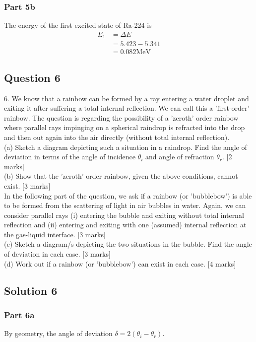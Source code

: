 \documentclass{article}
\begin{document}
\subsubsection{Part 5b}
The energy of the first excited state of Ra-224 is
\begin{align}
    E_1 &= \Delta E \\
    &= 5.423 - 5.341 \\
    &= 0.082 \mathrm{MeV}
\end{align}

\subsection{Question 6}
6. We know that a rainbow can be formed by a ray entering a water droplet and exiting it after suffering a total internal reflection. We can call this a 'first-order' rainbow. The question is regarding the possibility of a 'zeroth' order rainbow where parallel rays impinging on a spherical raindrop is refracted into the drop and then out again into the air directly (without total internal reflection). \\
(a) Sketch a diagram depicting such a situation in a raindrop. Find the angle of deviation in terms of the angle of incidence $\theta_{i}$ and angle of refraction $\theta_{r}$. [2 marks] \\
(b) Show that the 'zeroth' order rainbow, given the above conditions, cannot exist. [3 marks] \\
In the following part of the question, we ask if a rainbow (or 'bubblebow') is able to be formed from the scattering of light in air bubbles in water. Again, we can consider parallel rays (i) entering the bubble and exiting without total internal reflection and (ii) entering and exiting with one (assumed) internal reflection at the gas-liquid interface. [3 marks] \\
(c) Sketch a diagram/s depicting the two situations in the bubble. Find the angle of deviation in each case. [3 marks]\\
(d) Work out if a rainbow (or 'bubblebow') can exist in each case. [4 marks] 

\subsection{Solution 6}
\subsubsection{Part 6a}
By geometry, the angle of deviation $\delta=2(\theta_i - \theta_r)$.
\end{document}
